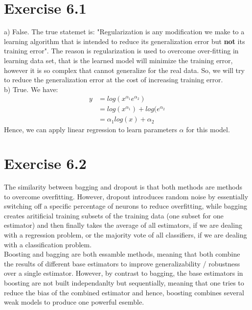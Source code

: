 \documentclass{article}
\begin{document}
\section*{Exercise 6.1}
a) False. The true statemet is: "Regularization is any modification we make to a learning algorithm that is intended to reduce its generalization error but \textbf{not} its training error". The reason is regularization is used to overcome over-fitting in learning data set, that is the learned model will minimize the training error, however it is so complex that cannot generalize for the real data. So, we will try to reduce the generalization error at the cost of increasing training error.\\
b) True. We have:
\begin{align*}
y &= log(x^{\alpha_1}e^{\alpha_2})\\
 &= log(x^{\alpha_1}) + log(e^{\alpha_2}\\
  &= \alpha_1 log(x) + \alpha_2
\end{align*}
Hence, we can apply linear regression to learn parameters $\alpha$ for this model.

\section*{Exercise 6.2}
The similarity between bagging and dropout is that both methods are methods to overcome overfitting. However, dropout introduces random noise by essentially switching off a specific percentage of neurons to reduce overfitting, while bagging creates aritificial training subsets of the training data (one subset for one estimator) and then finally takes the average of all estimators, if we are dealing with a regression problem, or the majority vote of all classifiers, if we are dealing with a classification problem.\\
Boosting and bagging are both essamble methods, meaning that both combine the results of different base estimators to improve generalizability / robustness over a single estimator. However, by contrast to bagging, the base estimators in boosting are not built independanlty but sequentially, meaning that one tries to reduce the bias of the combined estimator and hence, boosting combines several weak models to produce one powerful esemble.
\end{document}
